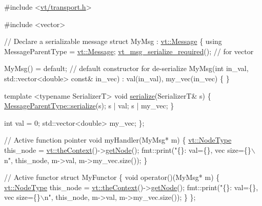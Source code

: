 \begin{DoxyCode}
\textcolor{preprocessor}{#include <\hyperlink{transport_8h}{vt/transport.h}>}

\textcolor{preprocessor}{#include <vector>}

\textcolor{comment}{// Declare a serializable message}
\textcolor{keyword}{struct }MyMsg : \hyperlink{structvt_1_1messaging_1_1_active_msg}{vt::Message} \{
  \textcolor{keyword}{using} MessageParentType = \hyperlink{namespacevt_a3a3ddfef40b4c90915fa43cdd5f129ea}{vt::Message};
  \hyperlink{message__serialize_8h_a54128d5338aaa9c918179826085e13d1}{vt\_msg\_serialize\_required}(); \textcolor{comment}{// for vector}

  MyMsg() = \textcolor{keywordflow}{default}; \textcolor{comment}{// default constructor for de-serialize}
  MyMsg(\textcolor{keywordtype}{int} in\_val, std::vector<double> \textcolor{keyword}{const}& in\_vec)
    : val(in\_val),
      my\_vec(in\_vec)
  \{ \}

  \textcolor{keyword}{template} <\textcolor{keyword}{typename} SerializerT>
  \textcolor{keywordtype}{void} \hyperlink{structvt_1_1messaging_1_1_active_msg_a758f02bef5991c48d6c9a56c30ca7ad9}{serialize}(SerializerT& s) \{
    \hyperlink{namespacecheckpoint_a075da4e7344cf037943362517e606c3a}{MessageParentType::serialize}(s);
    s | val;
    s | my\_vec;
  \}

  \textcolor{keywordtype}{int} val = 0;
  std::vector<double> my\_vec;
\};

\textcolor{comment}{// Active function pointer}
\textcolor{keywordtype}{void} myHandler(MyMsg* m) \{
  \hyperlink{namespacevt_a866da9d0efc19c0a1ce79e9e492f47e2}{vt::NodeType} this\_node = \hyperlink{namespacevt_a26551fe0e6e6a1371111df5b12c7e92c}{vt::theContext}()->\hyperlink{structvt_1_1ctx_1_1_context_a0d52c263ce8516546a67443d9a86fa5f}{getNode}();
  fmt::print(\textcolor{stringliteral}{"\{\}: val=\{\}, vec size=\{\}\(\backslash\)n"}, this\_node, m->val, m->my\_vec.size());
\}

\textcolor{comment}{// Active functor}
\textcolor{keyword}{struct }MyFunctor \{
  \textcolor{keywordtype}{void} operator()(MyMsg* m) \{
    \hyperlink{namespacevt_a866da9d0efc19c0a1ce79e9e492f47e2}{vt::NodeType} this\_node = \hyperlink{namespacevt_a26551fe0e6e6a1371111df5b12c7e92c}{vt::theContext}()->\hyperlink{structvt_1_1ctx_1_1_context_a0d52c263ce8516546a67443d9a86fa5f}{getNode}();
    fmt::print(\textcolor{stringliteral}{"\{\}: val=\{\}, vec size=\{\}\(\backslash\)n"}, this\_node, m->val, m->my\_vec.size());
  \}
\};


\end{DoxyCode}
